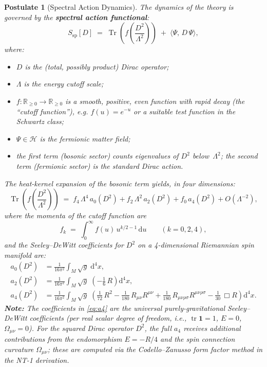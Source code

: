 \documentclass[12pt,a4paper]{article}
\theoremstyle{postulate}
\newtheorem{postulate}{Postulate}
\newcommand{\Tr}{\operatorname{Tr}}
\newcommand{\Hil}{\mathcal{H}}
\newcommand{\Dirac}{D}
\newcommand{\Cut}{\Lambda}
\newcommand{\Sspectral}{S_{\mathrm{sp}}}
\newcommand{\dd}{\mathrm{d}}
\newcommand{\eg}{\textit{e.g.}}
\begin{document}
\begin{postulate}[Spectral Action Dynamics]\label{post:dynamics}
The dynamics of the theory is governed by the \textbf{spectral action
functional}:
\begin{equation}\label{eq:spectral-action}
  \boxed{
    \Sspectral[\Dirac]
    \;=\; \Tr\!\left(f\!\left(\frac{\Dirac^2}{\Cut^2}\right)\right)
    \;+\; \bigl\langle \Psi,\, \Dirac\, \Psi \bigr\rangle,
  }
\end{equation}
where:
\begin{itemize}
  \item $\Dirac$ is the (total, possibly product) Dirac operator;
  \item $\Cut$ is the energy cutoff scale;
  \item $f : \mathbb{R}_{\geq 0} \to \mathbb{R}_{\geq 0}$ is a smooth,
        positive, even function with rapid decay (the ``cutoff function''),
        \eg{} $f(u) = e^{-u}$ or a suitable test function in the Schwartz class;
  \item $\Psi \in \Hil$ is the fermionic matter field;
  \item the first term (bosonic sector) counts eigenvalues of $\Dirac^2$
        below~$\Cut^2$; the second term (fermionic sector) is the standard
        Dirac action.
\end{itemize}

\noindent
The heat-kernel expansion of the bosonic term yields, in four dimensions:
\begin{equation}\label{eq:heat-kernel-expansion}
  \Tr\!\left(f\!\left(\frac{\Dirac^2}{\Cut^2}\right)\right)
  \;=\; f_4\,\Cut^4\, a_0(\Dirac^2)
      + f_2\,\Cut^2\, a_2(\Dirac^2)
      + f_0\,a_4(\Dirac^2)
      + O(\Cut^{-2}),
\end{equation}
where the \emph{momenta of the cutoff function} are
\begin{equation}\label{eq:moments}
  f_k \;=\; \int_0^\infty f(u)\, u^{k/2 - 1}\, \dd u
  \qquad (k = 0, 2, 4),
\end{equation}
and the \emph{Seeley--DeWitt coefficients} for $\Dirac^2$ on a
4-dimensional Riemannian spin manifold are:
\begin{align}
  a_0(\Dirac^2) &= \frac{1}{16\pi^2}\int_M \sqrt{g}\;\dd^4 x,
    \label{eq:a0} \\
  a_2(\Dirac^2) &= \frac{1}{16\pi^2}\int_M \sqrt{g}\;
    \left(-\tfrac{1}{6}\,R\right) \dd^4 x,
    \label{eq:a2} \\
  a_4(\Dirac^2) &= \frac{1}{16\pi^2}\int_M \sqrt{g}\;
    \left(\tfrac{1}{72}\,R^2
    - \tfrac{1}{180}\,R_{\mu\nu}R^{\mu\nu}
    + \tfrac{1}{180}\,R_{\mu\nu\rho\sigma}R^{\mu\nu\rho\sigma}
    - \tfrac{1}{30}\,\Box R\right) \dd^4 x.
    \label{eq:a4}
\end{align}
\noindent
\textbf{Note:} The coefficients in \eqref{eq:a4} are the universal
purely-gravitational Seeley--DeWitt coefficients (per real scalar degree
of freedom, i.e., $\operatorname{tr}\mathbf{1} = 1$, $E = 0$, $\Omega_{\mu\nu} = 0$).
For the squared Dirac operator $\Dirac^2$, the full $a_4$ receives
additional contributions from the endomorphism $E = -R/4$ and the spin
connection curvature $\Omega_{\mu\nu}$; these are computed via the
Codello--Zanusso form factor method in the NT-1 derivation.


\end{postulate}
\end{document}
